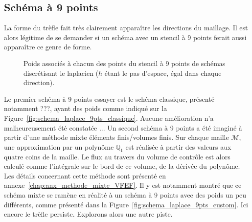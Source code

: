 \documentclass[main.tex]{subfiles}
\begin{document}
\subsection{Schéma à 9 points}
La forme du trèfle fait très clairement apparaître les directions du maillage. Il est alors légitime de se demander si un schéma avec un stencil à 9 points ferait aussi apparaître ce genre de forme. 
\begin{figure}[h]
\caption{\label{fig:schema_laplacien}Poids associés à chacun des points du stencil à 9 points de schémas discrétisant le laplacien ($h$ étant le pas d'espace, égal dans chaque direction).}
\end{figure}
Le premier schéma à 9 points essayer est le schéma classique, présenté notamment ???, ayant des poids comme indiqué sur la Figure~\ref{fig:schema_laplace_9pts_classique}. Aucune amélioration n'a malheureusement été constatée ... Un second schéma à 9 points a été imaginé à partir d'une méthode mixte éléments finis/volumes finis.
Sur chaque maille $\mathcal{M}$, une approximation par un polynôme $\mathbb{Q}_1$ est réalisée à partir des valeurs aux quatre coins de la maille. Le flux au travers du volume de contrôle est alors calculé comme l'intégrale sur le bord de ce volume, de la dérivée du polynôme. Les détails concernant cette méthode sont présenté en  annexe~\ref{chap:anx_methode_mixte_VFEF}. Il y est notamment montré que ce schéma mixte se ramène en réalité à un schéma à 9 points avec des poids un peu différents, comme présenté dans la Figure~\ref{fig:schema_laplace_9pts_custom}. 
Ici encore le trèfle persiste. Explorons alors une autre piste.
\end{document}
